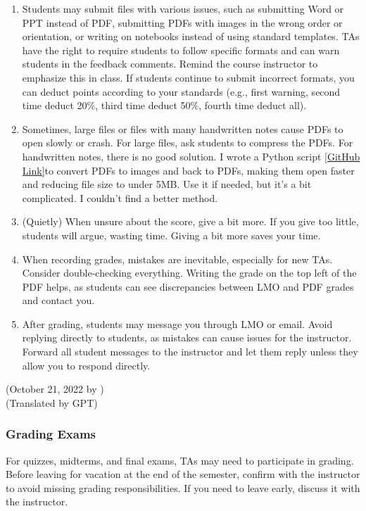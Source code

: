 \begin{enumerate}
\begin{figure}[H]
        \end{figure}
    \item Students may submit files with various issues, such as submitting Word or PPT instead of PDF, submitting PDFs with images in the wrong order or orientation, or writing on notebooks instead of using standard templates. TAs have the right to require students to follow specific formats and can warn students in the feedback comments. Remind the course instructor to emphasize this in class. If students continue to submit incorrect formats, you can deduct points according to your standards (e.g., first warning, second time deduct 20\%, third time deduct 50\%, fourth time deduct all).
    \item Sometimes, large files or files with many handwritten notes cause PDFs to open slowly or crash. For large files, ask students to compress the PDFs. For handwritten notes, there is no good solution. I wrote a Python script \href{https://github.com/kaiwu-astro/xp_pgrs_unofficial_guide/tree/main/fileshare/pdf_to_png_to_pdf.py}{[GitHub Link]}to convert PDFs to images and back to PDFs, making them open faster and reducing file size to under 5MB. Use it if needed, but it’s a bit complicated. I couldn’t find a better method.
    \item (Quietly) When unsure about the score, give a bit more. If you give too little, students will argue, wasting time. Giving a bit more saves your time.
    \item When recording grades, mistakes are inevitable, especially for new TAs. Consider double-checking everything. Writing the grade on the top left of the PDF helps, as students can see discrepancies between LMO and PDF grades and contact you.
    \item After grading, students may message you through LMO or email. Avoid replying directly to students, as mistakes can cause issues for the instructor. Forward all student messages to the instructor and let them reply unless they allow you to respond directly.
\end{enumerate}

\begin{flushright}
    (October 21, 2022 by \Wu) \\
    (Translated by GPT)
\end{flushright}

\subsubsection{Grading Exams}
For quizzes, midterms, and final exams, TAs may need to participate in grading. Before leaving for vacation at the end of the semester, confirm with the instructor to avoid missing grading responsibilities. If you need to leave early, discuss it with the instructor.

